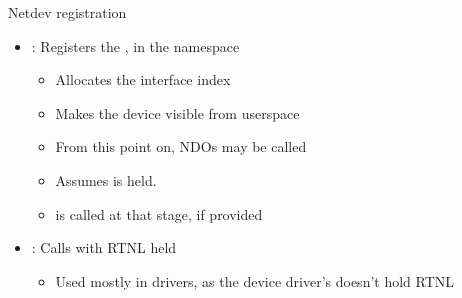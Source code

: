 \begin{frame}{Netdev registration}
	\begin{itemize}
		\item {} : Registers the , in the  namespace
			\begin{itemize}
				\item Allocates the interface index
				\item Makes the device visible from userspace
				\item From this point on, NDOs may be called
				\item Assumes  is held.
				\item {} is called at that stage, if provided
			\end{itemize}
		\item {} : Calls  with RTNL held
			\begin{itemize}
				\item Used mostly in drivers, as the device driver's  doesn't hold RTNL
			\end{itemize}
	\end{itemize}
\end{frame}

